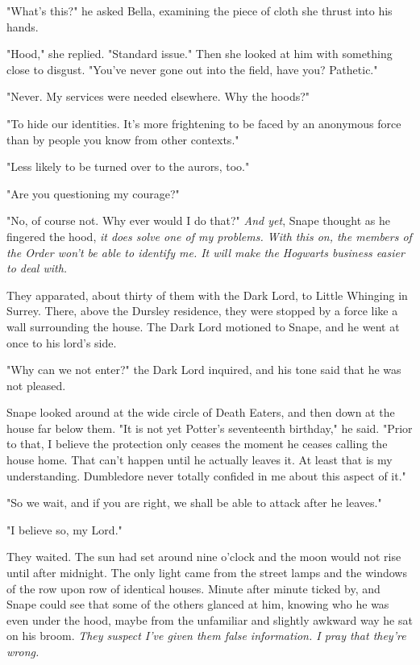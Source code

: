 "What's this?" he asked Bella, examining the piece of cloth she thrust into his hands.

"Hood," she replied. "Standard issue." Then she looked at him with something close to disgust. "You've never gone out into the field, have you? Pathetic."

"Never. My services were needed elsewhere. Why the hoods?"

"To hide our identities. It's more frightening to be faced by an anonymous force than by people you know from other contexts."

"Less likely to be turned over to the aurors, too."

"Are you questioning my courage?"

"No, of course not. Why ever would I do that?" \emph{And yet}, Snape thought as he fingered the hood, \emph{it does solve one of my problems. With this on, the members of the Order won't be able to identify me. It will make the Hogwarts business easier to deal with.}

They apparated, about thirty of them with the Dark Lord, to Little Whinging in Surrey. There, above the Dursley residence, they were stopped by a force like a wall surrounding the house. The Dark Lord motioned to Snape, and he went at once to his lord's side.

"Why can we not enter?" the Dark Lord inquired, and his tone said that he was not pleased.

Snape looked around at the wide circle of Death Eaters, and then down at the house far below them. "It is not yet Potter's seventeenth birthday," he said. "Prior to that, I believe the protection only ceases the moment he ceases calling the house home. That can't happen until he actually leaves it. At least that is my understanding. Dumbledore never totally confided in me about this aspect of it."

"So we wait, and if you are right, we shall be able to attack after he leaves."

"I believe so, my Lord."

They waited. The sun had set around nine o'clock and the moon would not rise until after midnight. The only light came from the street lamps and the windows of the row upon row of identical houses. Minute after minute ticked by, and Snape could see that some of the others glanced at him, knowing who he was even under the hood, maybe from the unfamiliar and slightly awkward way he sat on his broom. \emph{They suspect I've given them false information. I pray that they're wrong.}

